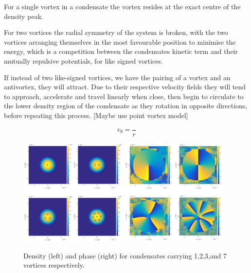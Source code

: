 For a single vortex in a condensate the vortex resides at the exact centre of the density peak.


For two vortices the radial symmetry of the system is broken, with the two vortices arranging themselves in the most favourable position to minimise the energy, which is a competition between the condensates kinetic term and their mutually repulsive potentials, for like signed vortices.

If instead of two like-signed vortices, we have the pairing of a vortex and an antivortex, they will attract. Due to their respective velocity fields they will tend to approach, accelerate and travel linearly when close, then begin to circulate to the lower density region of the condensate as they rotation in opposite directions, before repeating this process.
[Maybe use point vortex model]

\begin{equation}\label{eqn:angular_vel}
    v_\theta = \frac{}{r}
\end{equation}

\begin{figure}\centering
    \includegraphics[width=0.48\textwidth]{Images/ch4_vtx/fewvortex_rho.pdf}
    \includegraphics[width=0.48\textwidth]{Images/ch4_vtx/fewvortex_theta.pdf}
    \caption{Density (left) and phase (right) for condensates carrying 1,2,3,and 7 vortices respectively.}
    \label{fig:few_rho}
\end{figure}

